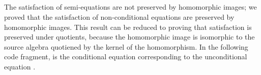 \begin{code}
\AgdaSpace{}%
\AgdaSpace{}%
\AgdaSpace{}%
\AgdaSpace{}%
\<%
\\
%
\>[4]\<%
\\
%
\>[4]\AgdaSpace{}%
\AgdaSpace{}%
\AgdaSpace{}%
\AgdaSymbol{(}\AgdaSpace{}%
\AgdaSymbol{)}\AgdaSpace{}%
\AgdaSpace{}%
\AgdaSymbol{(}\AgdaSpace{}%
\AgdaSpace{}%
\AgdaSymbol{)}\<%
\\
%
\>[4]\AgdaSpace{}%
\AgdaSpace{}%
\AgdaSymbol{(}\AgdaSpace{}%
\AgdaSpace{}%
\AgdaSpace{}%
\AgdaSymbol{)}\<%
\\
%
\>[4]\AgdaSpace{}%
\AgdaSpace{}%
\AgdaSymbol{(}\AgdaSpace{}%
\AgdaSpace{}%
\AgdaSpace{}%
\AgdaSymbol{)}\<%
\end{code}

The satisfaction of semi-equations are not preserved by homomorphic
images; we proved that the satisfaction of non-conditional equations
are preserved by homomorphic images. This result can be reduced to
proving that satisfaction is preserved under quotients, because the
homomorphic image is isomorphic to the source algebra quotiened by the
kernel of the homomorphism. In the following code fragment,
 is the conditional equation corresponding to the
unconditional equation .

\begin{code}
\>[3]\AgdaSpace{}%
\AgdaSymbol{:}\AgdaSpace{}%
\AgdaSpace{}%
\AgdaSpace{}%
\AgdaSpace{}%
\AgdaSpace{}%
\<%
\\
%
\>[3]\AgdaSpace{}%
\AgdaSymbol{=}\AgdaSpace{}%
\AgdaSpace{}%
\AgdaSymbol{(}\AgdaSpace{}%
\AgdaSymbol{)}\<%
\\
\>[3][@{}l@{\AgdaIndent{0}}]%
\>[5]%
\>[965I]\AgdaSpace{}%
\AgdaSpace{}%
\AgdaSpace{}%
\AgdaSymbol{(}\AgdaSpace{}%
\AgdaSpace{}%
\AgdaSpace{}%
\AgdaSymbol{)}\<%
\\
\>[.][@{}l@{}]\<[965I]%
\>[11]\AgdaSpace{}%
\AgdaSpace{}%
\AgdaSpace{}%
\AgdaSpace{}%
\AgdaSymbol{(}\AgdaSpace{}%
\AgdaSymbol{)}\<%
\end{code}

